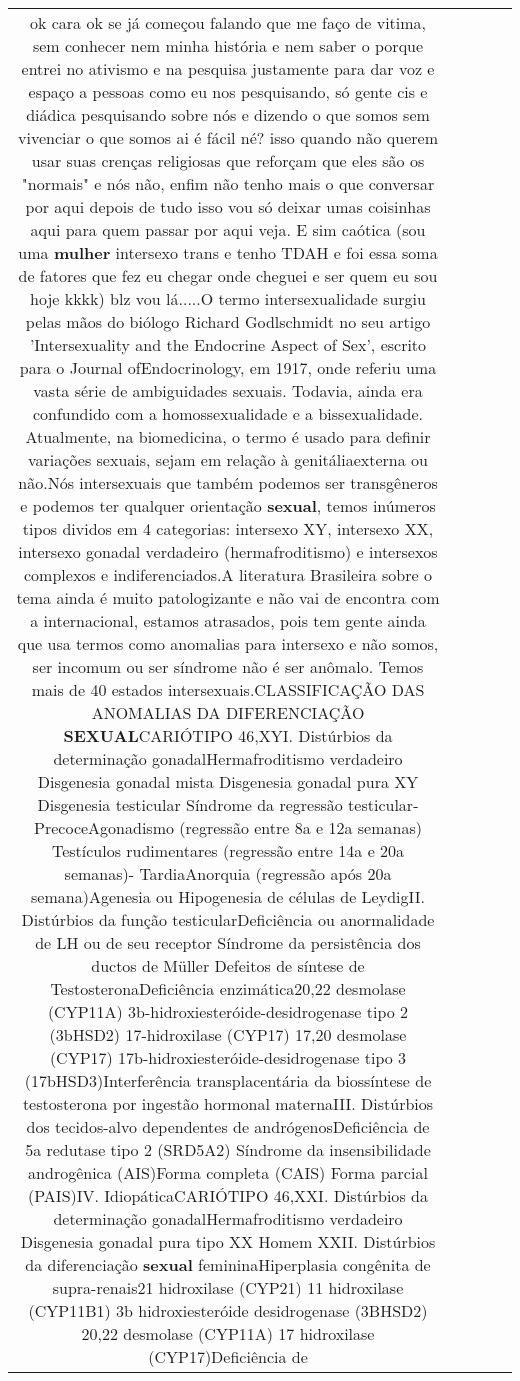 \documentclass[11pt]{article}
\newlength\mylength
\begin{document}
\begin{center}
\begin{longtable}{|C{.65\mylength}|C{.30\mylength}|C{.12\mylength}|C{.12\mylength}|C{.12\mylength}|}
  \small ok cara ok se já começou falando que me faço de vitima, sem conhecer nem minha história e nem saber o porque entrei no ativismo e na pesquisa justamente para dar voz e espaço a pessoas como eu nos pesquisando, só gente cis e diádica pesquisando sobre nós e dizendo o que somos sem vivenciar o que somos ai é fácil né? isso quando não querem usar suas crenças religiosas que reforçam que eles são os "normais" e nós não, enfim não tenho mais o que conversar por aqui depois de tudo isso vou só deixar umas coisinhas aqui para quem passar por aqui veja. E sim caótica (sou uma \textbf{mulher} intersexo trans e tenho TDAH e foi essa soma de fatores que fez eu chegar onde cheguei e ser quem eu sou hoje kkkk)  blz vou lá.....O termo intersexualidade surgiu pelas mãos do biólogo Richard Godlschmidt no seu artigo 'Intersexuality and the Endocrine Aspect of Sex', escrito para o Journal ofEndocrinology, em 1917, onde referiu uma vasta série de ambiguidades sexuais. Todavia, ainda era confundido com a homossexualidade e a bissexualidade. Atualmente, na biomedicina, o termo é usado para definir variações sexuais, sejam em relação à genitáliaexterna ou não.Nós intersexuais que também podemos ser transgêneros e podemos ter qualquer orientação \textbf{sexual}, temos inúmeros tipos dividos em 4 categorias: intersexo XY, intersexo XX, intersexo gonadal verdadeiro (hermafroditismo) e intersexos complexos e indiferenciados.A literatura Brasileira sobre o tema ainda é muito patologizante e não vai de encontra com a internacional, estamos atrasados, pois tem gente ainda que usa termos como anomalias para intersexo e não somos, ser incomum ou ser síndrome não é ser anômalo.  Temos mais de 40 estados intersexuais.CLASSIFICAÇÃO DAS ANOMALIAS DA DIFERENCIAÇÃO \textbf{SEXUAL}CARIÓTIPO 46,XYI. Distúrbios da determinação gonadalHermafroditismo verdadeiro Disgenesia gonadal mista Disgenesia gonadal pura XY Disgenesia testicular Síndrome da regressão testicular- PrecoceAgonadismo (regressão entre 8a e 12a semanas) Testículos rudimentares (regressão entre 14a e 20a semanas)- TardiaAnorquia (regressão após 20a semana)Agenesia ou Hipogenesia de células de LeydigII. Distúrbios da função testicularDeficiência ou anormalidade de LH ou de seu receptor Síndrome da persistência dos ductos de Müller Defeitos de síntese de TestosteronaDeficiência enzimática20,22 desmolase (CYP11A) 3b-hidroxiesteróide-desidrogenase tipo 2 (3bHSD2) 17-hidroxilase (CYP17) 17,20 desmolase (CYP17) 17b-hidroxiesteróide-desidrogenase tipo 3 (17bHSD3)Interferência transplacentária da biossíntese de testosterona por ingestão hormonal maternaIII. Distúrbios dos tecidos-alvo dependentes de andrógenosDeficiência de 5a redutase tipo 2 (SRD5A2) Síndrome da insensibilidade androgênica (AIS)Forma completa (CAIS) Forma parcial (PAIS)IV. IdiopáticaCARIÓTIPO 46,XXI. Distúrbios da determinação gonadalHermafroditismo verdadeiro Disgenesia gonadal pura tipo XX Homem XXII. Distúrbios da diferenciação \textbf{sexual} femininaHiperplasia congênita de supra-renais21 hidroxilase (CYP21) 11 hidroxilase (CYP11B1) 3b hidroxiesteróide desidrogenase (3BHSD2) 20,22 desmolase (CYP11A) 17 hidroxilase (CYP17)Deficiência de 
\end{longtable}
\end{center}
\end{document}
